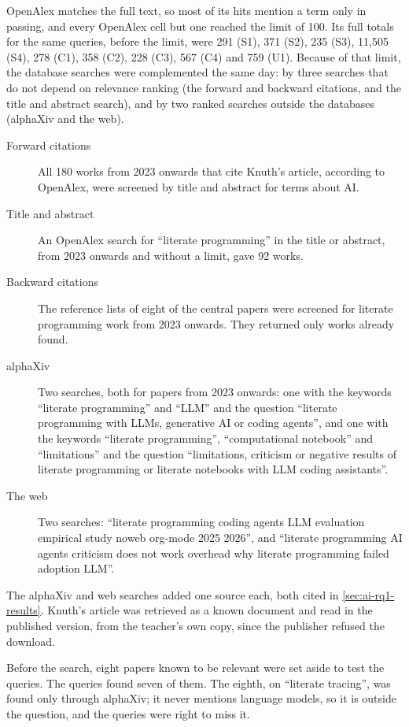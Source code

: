 OpenAlex matches the full text, so most of its hits mention a term only in
passing, and every OpenAlex cell but one reached the limit of 100.
Its full totals for the same queries, before the limit, were 291 (S1), 371
(S2), 235 (S3), 11,505 (S4), 278 (C1), 358 (C2), 228 (C3), 567 (C4) and 759
(U1).
Because of that limit, the database searches were complemented the same day:
by three searches that do not depend on relevance ranking (the forward and
backward citations, and the title and abstract search), and by two ranked
searches outside the databases (alphaXiv and the web).
\begin{description}
  \item[Forward citations] All 180 works from 2023 onwards that cite Knuth's
    article, according to OpenAlex, were screened by title and abstract for
    terms about AI.
  \item[Title and abstract] An OpenAlex search for \enquote{literate
    programming} in the title or abstract, from 2023 onwards and without a
    limit, gave 92 works.
  \item[Backward citations] The reference lists of eight of the central papers
    were screened for literate programming work from 2023 onwards.
    They returned only works already found.
  \item[alphaXiv] Two searches, both for papers from 2023 onwards: one with the
    keywords \enquote{literate programming} and \enquote{LLM} and the question
    \enquote{literate programming with LLMs, generative AI or coding agents},
    and one with the keywords \enquote{literate programming},
    \enquote{computational notebook} and \enquote{limitations} and the question
    \enquote{limitations, criticism or negative results of literate programming
    or literate notebooks with LLM coding assistants}.
  \item[The web] Two searches: \enquote{literate programming coding agents LLM
    evaluation empirical study noweb org-mode 2025 2026}, and \enquote{literate
    programming AI agents criticism does not work overhead why literate
    programming failed adoption LLM}.
\end{description}
The alphaXiv and web searches added one source each, both cited in
\cref{sec:ai-rq1-results}.
Knuth's article was retrieved as a known document and read in the published
version, from the teacher's own copy, since the publisher refused the download.

Before the search, eight papers known to be relevant were set aside to test the
queries.
The queries found seven of them.
The eighth, on \enquote{literate tracing}\autocite{Sotoudeh2025}, was found
only through alphaXiv; it never mentions language models, so it is outside the
question, and the queries were right to miss it.

